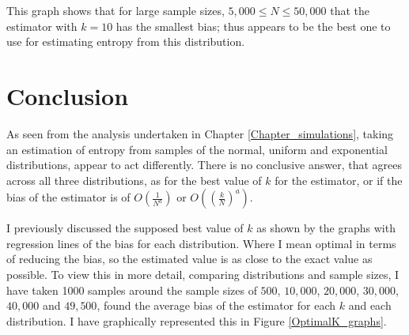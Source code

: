 \documentclass[12pt]{report}
\begin{document}
This graph shows that for large sample sizes, $5,000 \leq N \leq 50,000$ that the estimator with $k=10$ has the smallest bias; thus appears to be the best one to use for estimating entropy from this distribution.









\chapter{Conclusion} \label{chapter_conclusion}

As seen from the analysis undertaken in Chapter \ref{Chapter_simulations}, taking an estimation of entropy from samples of the normal, uniform and exponential distributions, appear to act differently. There is no conclusive answer, that agrees across all three distributions,  as for the best value of $k$ for the estimator, or if the bias of the estimator is of $O \left( \frac{1}{N^{a}} \right)$ or $O\left( \left( \frac{k}{N} \right)^{a} \right)$. 

I previously discussed the supposed best value of $k$ as shown by the graphs with regression lines of the bias for each distribution. Where I mean optimal in terms of reducing the bias, so the estimated value is as close to the exact value as possible. To view this in more detail, comparing distributions and sample sizes, I have taken 1000 samples around the sample sizes of $500$, $10,000$, $20,000$, $30,000$, $40,000$ and $49,500$, found the average bias of the estimator for each $k$ and each distribution. I have graphically represented this in Figure \ref{OptimalK_graphs}. 
\end{document}
